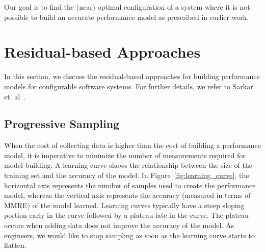 \documentclass[sigconf]{acmart}
\begin{document}
 Our goal is to find the (near) optimal configuration of a system where it is not possible to build an accurate performance model as prescribed in earlier work.

\section{Residual-based Approaches}\label{sec:residual}

In this section, we discuss the residual-based approaches for building performance models for configurable software systems. For further details, we refer to Sarkar et. al~\cite{sarkar2015cost}.




\subsection{Progressive Sampling}
When the cost of collecting data is higher than the cost of building a performance model, it is imperative to minimize the number of measurements required for model building. A learning curve shows the relationship between the size of the training set and the accuracy of the model. In Figure~\ref{fig:learning_curve}, the horizontal axis represents the number of samples used to create the performance model, whereas the vertical axis represents the accuracy (measured in terms of MMRE) of the model learned. 
Learning curves typically have a steep sloping portion early in the curve followed by a plateau late in the curve. The plateau occurs when adding data does not improve the accuracy of the model. As engineers, we would like to stop sampling as soon as the learning curve starts to flatten.
\end{document}
